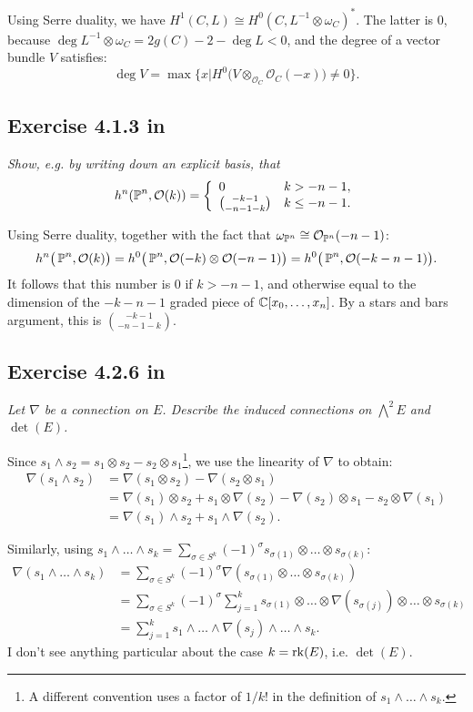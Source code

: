\documentclass{article}
\begin{document}
Using Serre duality, we have $H^1(C,L) \cong H^0(C,L^{-1}\otimes \omega_C)^*$. The latter is 0, because $\deg L^{-1}
\otimes \omega_C = 2g(C) - 2 - \deg L < 0$, and the degree of a vector bundle $V$ satisfies:
\[	\deg V = \max \{x| H^0\big(V \otimes_{\mathcal{O}_C} \mathcal{O}_C(-x)\big) \neq 0\}.	\]


\subsection*{Exercise 4.1.3 in \cite{Huy}}
\emph{Show, e.g. by writing down an explicit basis, that}
\[	h^n(\operatorname{\mathbb{P}}^n, \mathcal{O}(k)) = \left\{ \begin{array} {ll} 0 & k>-n-1, \\ \binom{-k-1}{-n-1-k} & k\leq -n-1. \end{array} \right.	\]
\vspace{3mm}

Using Serre duality, together with the fact that $\omega_{\operatorname{\mathbb{P}}^n} \cong \mathcal{O}_{\operatorname{\mathbb{P}}^n}(-n-1)$:
\[	h^n\big(\operatorname{\mathbb{P}}^n,\mathcal{O}(k)\big) = h^0\big(\operatorname{\mathbb{P}}^n,\mathcal{O}(-k)\otimes \mathcal{O}(-n-1)\big) = h^0\big(\operatorname{\mathbb{P}}^n,
\mathcal{O}(-k-n-1)\big).	\]
It follows that this number is 0 if $k>-n-1$, and otherwise equal to the dimension of the $-k-n-1$ graded piece of
$\mathbb{C}[x_0, \dots, x_n]$. By a stars and bars argument, this is $\binom{-k-1}{-n-1-k}$.


\subsection*{Exercise 4.2.6 in \cite{Huy}}
\emph{Let $\nabla$ be a connection on $E$. Describe the induced connections on $\bigwedge^2 E$ and $\det(E)$.}
\vspace{3mm}

Since $s_1 \wedge s_2 = s_1 \otimes s_2 - s_2 \otimes s_1$\footnote{A different convention uses a factor of
$1/k!$ in the definition of $s_1\wedge \dots \wedge s_k$.}, we use the linearity of $\nabla$ to obtain:
\begin{align*}
	\nabla(s_1 \wedge s_2) &= \nabla(s_1 \otimes s_2) - \nabla (s_2\otimes s_1) \\
&= \nabla(s_1)\otimes s_2 + s_1 \otimes \nabla(s_2) - \nabla(s_2) \otimes s_1 - s_2\otimes \nabla(s_1) \\
&= \nabla(s_1)\wedge s_2 + s_1 \wedge \nabla(s_2).
\end{align*}

Similarly, using $s_1\wedge \dots \wedge s_k = \sum_{\sigma \in S^k} (-1)^{\sigma} s_{\sigma(1)}\otimes \dots \otimes 
s_{\sigma(k)}$:
\begin{align*}
\nabla(s_1\wedge \dots \wedge s_k) &= \sum_{\sigma \in S^k}(-1)^{\sigma} \nabla(s_{\sigma(1)}\otimes \dots \otimes 
s_{\sigma(k)}) \\
&= \sum_{\sigma \in S^k}(-1)^{\sigma} \sum_{j=1}^k s_{\sigma(1)}\otimes \dots \otimes \nabla(s_{\sigma(j)}) \otimes
\dots \otimes s_{\sigma(k)} \\
&= \sum_{j=1}^k s_1 \wedge\dots \wedge \nabla(s_j) \wedge \dots \wedge s_k.
\end{align*}
I don't see anything particular about the case $k = \operatorname{rk}(E)$, i.e. $\det(E)$.
\end{document}
